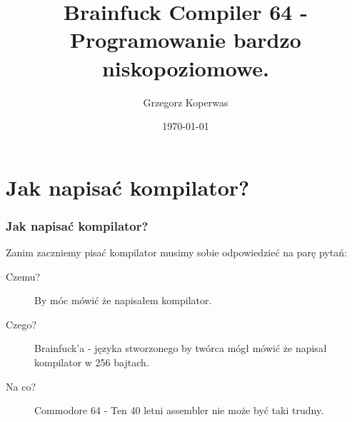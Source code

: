 \documentclass[aspectratio=169]{beamer}
\title[BFC64]{Brainfuck Compiler 64 - Programowanie bardzo niskopoziomowe.}
\author{Grzegorz Koperwas}
\date{\today}
\begin{document}
\begin{frame}
    \titlepage
\end{frame}
\begin{frame}
    \tableofcontents
\end{frame}
\section{Jak napisać kompilator?}
\begin{frame}
    \frametitle{Jak napisać kompilator?}
    Zanim zaczniemy pisać kompilator musimy sobie odpowiedzieć na parę pytań:

    \begin{description}
        \item[Czemu?] \pause By móc mówić że napisałem kompilator.
        \item[Czego?] \pause Brainfuck'a - języka stworzonego by twórca mógł mówić że napisał kompilator w 256 bajtach.
        \item[Na co?] \pause Commodore 64 - Ten 40 letni assembler nie może być taki trudny.
    \end{description}
\end{frame}
\end{document}
